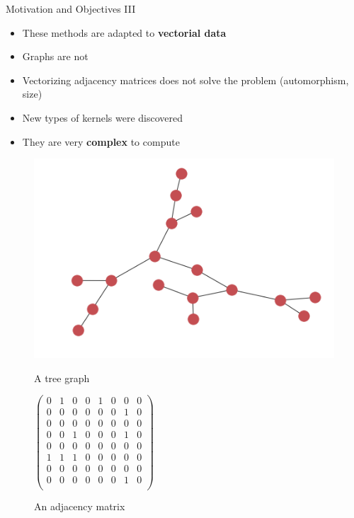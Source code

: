 \documentclass[compress]{beamer}
\begin{document}
\begin{frame}{Motivation and Objectives III}
\begin{itemize}
	\item These methods are adapted to \textbf{vectorial data}
	\item Graphs are not
	\item Vectorizing adjacency matrices does not solve the problem (automorphism, size)
	\item New types of kernels were discovered
	\item They are very \textbf{complex} to compute
\end{itemize}
\begin{figure}
	\begin{multicols}{2}
		\includegraphics[width=\linewidth]{data/graphs/big_graph_no_label.png}
		\caption*{A tree graph}\par
		$\begin{pmatrix}
		0 & 1 & 0 & 0 & 1 & 0 & 0 & 0 \\ 
		0 & 0 & 0 & 0 & 0 & 0 & 1 & 0 \\
		0 & 0 & 0 & 0 & 0 & 0 & 0 & 0 \\
		0 & 0 & 1 & 0 & 0 & 0 & 1 & 0 \\
		0 & 0 & 0 & 0 & 0 & 0 & 0 & 0 \\
		1 & 1 & 1 & 0 & 0 & 0 & 0 & 0 \\
		0 & 0 & 0 & 0 & 0 & 0 & 0 & 0 \\
		0 & 0 & 0 & 0 & 0 & 0 & 1 & 0 \\
		\end{pmatrix}$
		\caption*{An adjacency matrix}
	\end{multicols}
\end{figure}
\end{frame}
\end{document}
